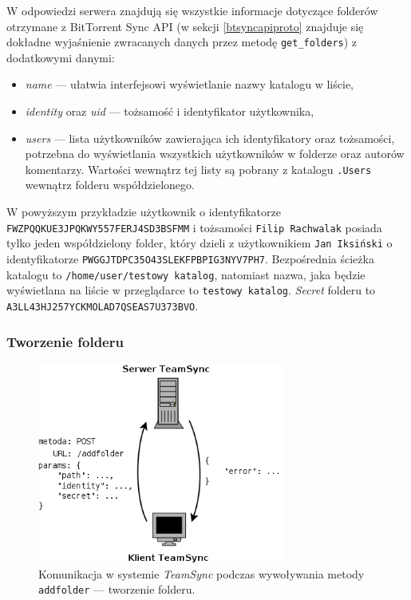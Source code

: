 \documentclass[polish,a4paper,twoside]{ppfcmthesis}
\begin{document}
W odpowiedzi serwera znajdują się wszystkie informacje dotyczące folderów otrzymane z BitTorrent Sync API (w sekcji \ref{btsyncapiproto} znajduje się dokładne wyjaśnienie zwracanych danych przez metodę \texttt{get\_folders}) z dodatkowymi danymi:

\begin{itemize}[noitemsep]
  \item \emph{name} --- ułatwia interfejsowi wyświetlanie nazwy katalogu w liście,
  
  \item \emph{identity} oraz \emph{uid} --- tożsamość i identyfikator użytkownika,
  
  \item \emph{users} --- lista użytkowników zawierająca ich identyfikatory oraz tożsamości, potrzebna do wyświetlania wszystkich użytkowników w folderze oraz autorów komentarzy. Wartości wewnątrz tej listy są pobrany z katalogu \texttt{.Users} wewnątrz folderu współdzielonego.
\end{itemize}

W powyższym przykładzie użytkownik o identyfikatorze \texttt{FWZPQQKU\-E3JPQKWY\-557FERJ4\-SD3BSFMM} i tożsamości \texttt{Filip Rachwalak} posiada tylko jeden współdzielony folder, który dzieli z użytkownikiem \texttt{Jan Iksiński} o identyfikatorze \texttt{PWGGJTDP\-C35O43SL\-EKFPBPIG3\-NYV7PH7}. Bezpośrednia ścieżka katalogu to \texttt{/home/user/\-testowy katalog}, natomiast nazwa, jaka będzie wyświetlana na liście w przeglądarce to \texttt{testowy katalog}. \emph{Secret} folderu to \texttt{A3LL43HJ2\-57YCKMOL\-AD7QSEAS7\-U373BVO}.

\subsubsection*{Tworzenie folderu}

\begin{figure}[h!]
  \vspace{5pt}
  \begin{center}
    \includegraphics[width=230pt]{figures/metaddfolder.png}
  \end{center}
  \caption{Komunikacja w systemie \emph{TeamSync} podczas wywoływania metody \texttt{addfolder} --- tworzenie folderu.}
  \label{picmetgetfolders}
\end{figure}
\end{document}
